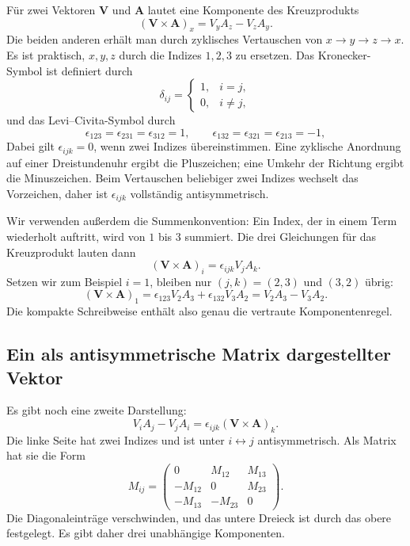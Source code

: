 Für zwei Vektoren \(\mathbf V\) und \(\mathbf A\) lautet eine Komponente des Kreuzprodukts
\begin{equation}
  (\mathbf V\times\mathbf A)_x
  =
  V_yA_z-V_zA_y.
\end{equation}
Die beiden anderen erhält man durch zyklisches Vertauschen von \(x\to y\to z\to x\). Es ist praktisch, \(x,y,z\) durch die Indizes \(1,2,3\) zu ersetzen. Das Kronecker-Symbol ist definiert durch
\begin{equation}
  \delta_{ij}
  =
  \begin{cases}
    1,&i=j,\\
    0,&i\ne j,
  \end{cases}
\end{equation}
und das Levi--Civita-Symbol durch
\begin{equation}
  \epsilon_{123}=\epsilon_{231}=\epsilon_{312}=1,
  \qquad
  \epsilon_{132}=\epsilon_{321}=\epsilon_{213}=-1,
\end{equation}
Dabei gilt \(\epsilon_{ijk}=0\), wenn zwei Indizes übereinstimmen. Eine zyklische Anordnung auf einer Dreistundenuhr ergibt die Pluszeichen; eine Umkehr der Richtung ergibt die Minuszeichen. Beim Vertauschen beliebiger zwei Indizes wechselt das Vorzeichen, daher ist \(\epsilon_{ijk}\) vollständig antisymmetrisch.

Wir verwenden außerdem die Summenkonvention: Ein Index, der in einem Term wiederholt auftritt, wird von \(1\) bis \(3\) summiert. Die drei Gleichungen für das Kreuzprodukt lauten dann
\begin{equation}
  (\mathbf V\times\mathbf A)_i
  =
  \epsilon_{ijk}V_jA_k.
\end{equation}
Setzen wir zum Beispiel \(i=1\), bleiben nur \((j,k)=(2,3)\) und \((3,2)\) übrig:
\begin{equation}
  (\mathbf V\times\mathbf A)_1
  =
  \epsilon_{123}V_2A_3
  +\epsilon_{132}V_3A_2
  =
  V_2A_3-V_3A_2.
\end{equation}
Die kompakte Schreibweise enthält also genau die vertraute Komponentenregel.

\subsection{Ein als antisymmetrische Matrix dargestellter Vektor}

Es gibt noch eine zweite Darstellung:
\begin{equation}
  V_iA_j-V_jA_i
  =
  \epsilon_{ijk}(\mathbf V\times\mathbf A)_k.
\end{equation}
Die linke Seite hat zwei Indizes und ist unter \(i\leftrightarrow j\) antisymmetrisch. Als Matrix hat sie die Form
\begin{equation}
  M_{ij}
  =
  \begin{pmatrix}
    0&M_{12}&M_{13}\\
    -M_{12}&0&M_{23}\\
    -M_{13}&-M_{23}&0
  \end{pmatrix}.
\end{equation}
Die Diagonaleinträge verschwinden, und das untere Dreieck ist durch das obere festgelegt. Es gibt daher drei unabhängige Komponenten.

